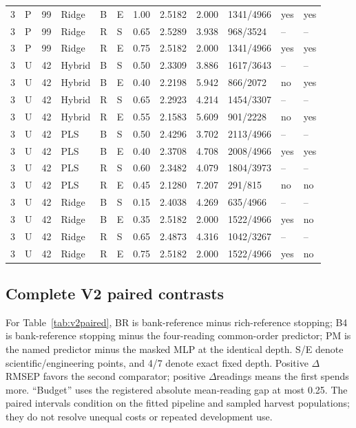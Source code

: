 \documentclass[10pt,a4paper]{article}
\begin{document}
\begin{landscape}
\begin{longtable}{rlrlllrrrlll}
3 & P & 99 & Ridge & B & E & 1.00 & 2.5182 & 2.000 & 1341/4966 & yes & yes \\
3 & P & 99 & Ridge & R & S & 0.65 & 2.5289 & 3.938 & 968/3524 & -- & -- \\
3 & P & 99 & Ridge & R & E & 0.75 & 2.5182 & 2.000 & 1341/4966 & yes & yes \\
3 & U & 42 & Hybrid & B & S & 0.50 & 2.3309 & 3.886 & 1617/3643 & -- & -- \\
3 & U & 42 & Hybrid & B & E & 0.40 & 2.2198 & 5.942 & 866/2072 & no & yes \\
3 & U & 42 & Hybrid & R & S & 0.65 & 2.2923 & 4.214 & 1454/3307 & -- & -- \\
3 & U & 42 & Hybrid & R & E & 0.55 & 2.1583 & 5.609 & 901/2228 & no & yes \\
3 & U & 42 & PLS & B & S & 0.50 & 2.4296 & 3.702 & 2113/4966 & -- & -- \\
3 & U & 42 & PLS & B & E & 0.40 & 2.3708 & 4.708 & 2008/4966 & yes & yes \\
3 & U & 42 & PLS & R & S & 0.60 & 2.3482 & 4.079 & 1804/3973 & -- & -- \\
3 & U & 42 & PLS & R & E & 0.45 & 2.1280 & 7.207 & 291/815 & no & no \\
3 & U & 42 & Ridge & B & S & 0.15 & 2.4038 & 4.269 & 635/4966 & -- & -- \\
3 & U & 42 & Ridge & B & E & 0.35 & 2.5182 & 2.000 & 1522/4966 & yes & no \\
3 & U & 42 & Ridge & R & S & 0.65 & 2.4873 & 4.316 & 1042/3267 & -- & -- \\
3 & U & 42 & Ridge & R & E & 0.75 & 2.5182 & 2.000 & 1522/4966 & yes & no \\
\end{longtable}
\endgroup
\end{landscape}

\subsection{Complete V2 paired contrasts}
For Table~\ref{tab:v2paired}, BR is bank-reference minus rich-reference stopping; B4 is bank-reference stopping minus the four-reading common-order predictor; PM is the named predictor minus the masked MLP at the identical depth. S/E denote scientific/engineering points, and 4/7 denote exact fixed depth. Positive $\Delta$RMSEP favors the second comparator; positive $\Delta$readings means the first spends more. ``Budget'' uses the registered absolute mean-reading gap at most 0.25. The paired intervals condition on the fitted pipeline and sampled harvest populations; they do not resolve unequal costs or repeated development use.
\end{document}
